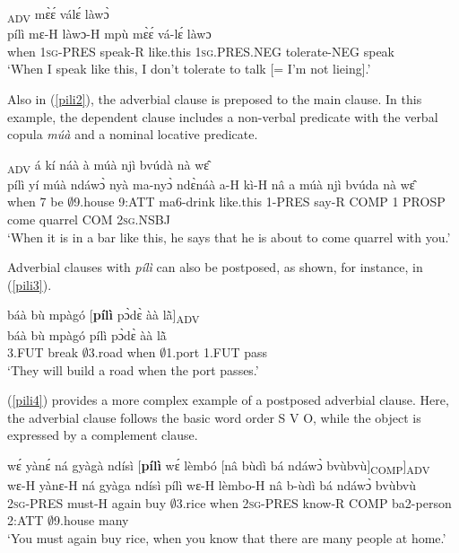 \begin{exe} 
\ex\label{pili1}
  \textsubscript{ADV} mɛ̀ɛ́ válɛ́ làwɔ̀ \\ 
           pílì mɛ-H làwɔ-H mpù mɛ̀ɛ́ vá-lɛ́ làwɔ \\
           when 1\textsc{sg}-PRES speak-R like.this 1\textsc{sg}.PRES.NEG tolerate-NEG speak  \\
    \trans `When I speak like this, I don't tolerate to talk [= I'm not lieing].'
\end{exe}

Also in (\ref{pili2}), the adverbial clause is preposed to the main clause. In this example, the dependent clause includes a non-verbal predicate with the verbal copula {\itshape múà} and a nominal locative predicate. 

\begin{exe} 
\ex\label{pili2}
  \textsubscript{ADV} á kí náà à múà njì bvúdà nà wɛ̂\\
      pílì yí múà ndáwɔ̀ nyà ma-nyɔ̀ ndɛ̀náà a-H kì-H nâ a múà njì bvúda nà wɛ̂ \\
         when 7 be $\emptyset$9.house 9:ATT ma6-drink like.this 1-PRES say-R COMP 1 PROSP come quarrel COM 2\textsc{sg}.NSBJ  \\
    \trans `When it is in a bar like this, he says that he is about to come quarrel with you.'
\end{exe}

\noindent Adverbial clauses with {\itshape pílì} can also be postposed, as shown, for instance, in (\ref{pili3}).

\begin{exe} 
\ex\label{pili3} 
  \glll báà bù mpàgó [{\bfseries pílì} pɔ̀dɛ̀ àà lã̀]\textsubscript{ADV} \\
      báà bù mpàgó pílì pɔ̀dɛ̀ àà lã̀ \\
        3.FUT break  $\emptyset$3.road when $\emptyset$1.port 1.FUT pass \\
    \trans `They will build a road when the port passes.'
\end{exe}

(\ref{pili4}) provides a more complex example of a postposed adverbial clause. Here, the adverbial clause follows the basic word order S V O, while the object is expressed by a complement clause.

\begin{exe} 
\ex\label{pili4} 
  \glll  wɛ́ yànɛ́ ná gyàgà ndísì [{\bfseries pílì} wɛ́ lèmbó [nâ bùdì bá ndáwɔ̀ bvùbvù]\textsubscript{COMP}]\textsubscript{ADV} \\
     wɛ-H yànɛ-H ná gyàga ndísì pílì wɛ-H lèmbo-H nâ b-ùdì bá ndáwɔ̀ bvùbvù \\
        2\textsc{sg}-PRES must-H again buy $\emptyset$3.rice when 2\textsc{sg}-PRES know-R COMP ba2-person 2:ATT $\emptyset$9.house many \\
    \trans `You must again buy rice, when you know that there are many people at home.'
\end{exe}




